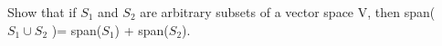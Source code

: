 Show that if $S_1$ and $S_2$ are arbitrary subsets of a vector space $\mathrm{V}$, then span($S_1 \cup S_2$ )= span($S_1$) + span($S_2$).

\begin{tcolorbox}
	\begin{solution}
		
	\end{solution}
\end{tcolorbox}